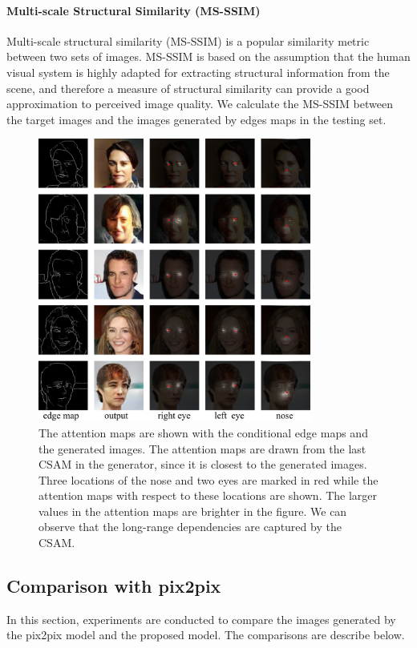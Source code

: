 \paragraph{Multi-scale Structural Similarity (MS-SSIM)} Multi-scale structural similarity (MS-SSIM) is a popular similarity metric between two sets of images. MS-SSIM is based on the assumption that the human visual system is highly adapted for extracting structural information from the scene, and therefore a measure of structural similarity can provide a good approximation to perceived image quality. We calculate the MS-SSIM between the target images and the images generated by edges maps in the testing set.
%
%
\begin{figure}
	\includegraphics[width=0.8\textwidth]{figures/attention}
	\caption{The attention maps are shown with the conditional edge maps and the generated images. The attention maps are drawn from the last CSAM in the generator, since it is closest to the generated images. Three locations of the nose and two eyes are marked in red while the attention maps with respect to these locations are shown. The larger values in the attention maps are brighter in the figure. We can observe that the long-range dependencies are captured by the CSAM.}
	\label{fig:attention}
\end{figure}
%
%
\subsection{Comparison with pix2pix}
%
In this section, experiments are conducted to compare the images generated by the pix2pix model and the proposed model. The comparisons are describe below.

